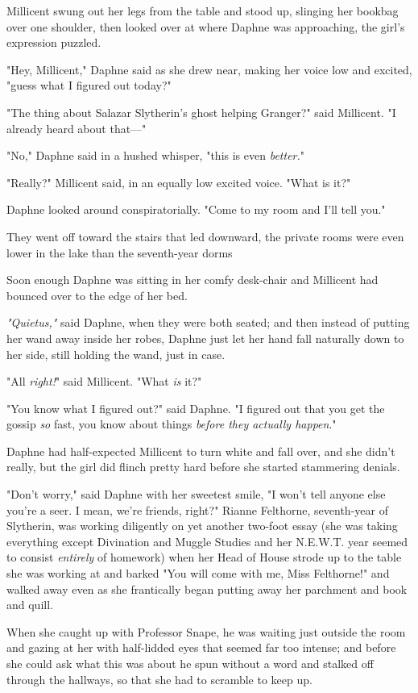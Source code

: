 Millicent swung out her legs from the table and stood up, slinging her bookbag
over one shoulder, then looked over at where Daphne was approaching, the girl's
expression puzzled.

"Hey, Millicent," Daphne said as she drew near, making her voice low and
excited, "guess what I figured out today?"

"The thing about Salazar Slytherin's ghost helping Granger?" said Millicent. "I
already heard about that\mbox{---}"

"No," Daphne said in a hushed whisper, "this is even \emph{better.}"

"Really?" Millicent said, in an equally low excited voice. "What is it?"

Daphne looked around conspiratorially. "Come to my room and I'll tell you."

They went off toward the stairs that led downward, the private rooms were even
lower in the lake than the seventh-year dorms{\el}

Soon enough Daphne was sitting in her comfy desk-chair and Millicent had
bounced over to the edge of her bed.

\emph{"Quietus,"} said Daphne, when they were both seated; and then instead of
putting her wand away inside her robes, Daphne just let her hand fall naturally
down to her side, still holding the wand, just in case.

"All \emph{right!}" said Millicent. "What \emph{is} it?"

"You know what I figured out?" said Daphne. "I figured out that you get the
gossip \emph{so} fast, you know about things \emph{before they actually
happen}."

Daphne had half-expected Millicent to turn white and fall over, and she didn't
really, but the girl did flinch pretty hard before she started stammering
denials.

"Don't worry," said Daphne with her sweetest smile, "I won't tell anyone else
you're a seer. I mean, we're friends, right?"
\sbreak
Rianne Felthorne, seventh-year of Slytherin, was working diligently on yet
another two-foot essay (she was taking everything except Divination and Muggle
Studies and her N.E.W.T. year seemed to consist \emph{entirely} of homework)
when her Head of House strode up to the table she was working at and barked
"You will come with me, Miss Felthorne!" and walked away even as she
frantically began putting away her parchment and book and quill.

When she caught up with Professor Snape, he was waiting just outside the room
and gazing at her with half-lidded eyes that seemed far too intense; and before
she could ask what this was about he spun without a word and stalked off
through the hallways, so that she had to scramble to keep up.

